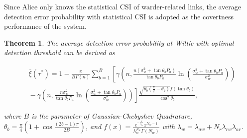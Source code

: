 \documentclass[conference]{IEEEtran}
\newtheorem{theorem}{Theorem}
\begin{document}
Since Alice only knows the statistical CSI of warder-related links, the average detection error probability with statistical CSI is adopted as the covertness performance of the system.

\begin{theorem}
The average detection error probability at Willie with optimal	detection threshold can be derived as
	\begin{small}
	\begin{equation}\label{ave_Pd1}
	\begin{aligned}
		&{\overline \xi }\!\left( {{\tau ^*}} \!\right) \!=\! 1\!\!-\!\! \frac{\pi }{{B\Gamma \left( n \right)}}\sum\limits_{b = 1}^B {\!\left[\! {\gamma\! \left(\!\! {n,\!\frac{{n\left( {\sigma _w^2 \!+\! \tan {\theta _b}{P_a}} \right)}}{{\tan {\theta _b}{P_a}}}\!\ln\! \left(\!\! {\frac{{\sigma _w^2 \!+\! \tan {\theta _b}{P_a}}}{{\sigma _w^2}}} \!\!\right)\!} \!\!\right)\!\!} \right.}     \\
		&\left. { \!-\! \gamma\! \left(\! {n,\!\frac{{n\sigma _w^2}}{{\tan {\theta _b}{P_a}}}\!\ln \!\!\left(\! {\frac{{\sigma _w^2 \!+\! \tan {\theta _b}{P_a}}}{{\sigma _w^2}}} \!\!\right)\!} \!\right)\!} \!\right]\!\!\frac{{\sqrt {{\theta _b}\!\left(\! {\frac{\pi }{2} \!-\! {\theta _b}} \right)} {f}\left( {\tan {\theta _b}} \right)\!}}{{{{\cos }^2}{\theta _b}}},
	\end{aligned}
\end{equation}
\end{small}
where $B$ is the parameter of Gaussian-Chebyshev Quadrature, ${\theta _b} = \frac{\pi }{4}\left( {1 + \cos \frac{{\left( {2b - 1} \right)\pi }}{{2B}}} \right)$, and ${{f}}(x) = \frac{{{e^{ - \frac{x}{{{\lambda _w}}}}}{x^{{N_w} - 1}}}}{{\lambda _w^{{N_w}}\Gamma \left( {{N_w}} \right)}}$ with ${\lambda _w} = {\lambda _{aw}} + {N_r}{\lambda _{rw}}{\lambda _{ar}}$.
\end{theorem}
\end{document}
